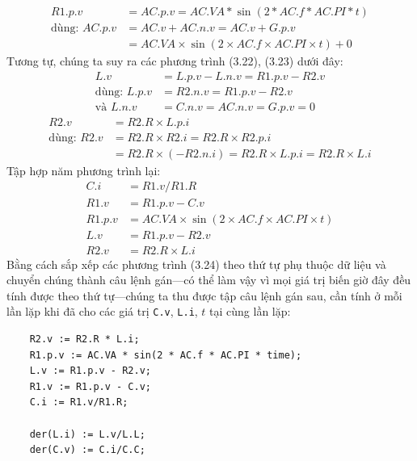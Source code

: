 \begin{equation}
\begin{aligned}
R1.p.v&=AC.p.v=AC.VA*\sin(2*AC.f*AC.PI*t)\\
\text{dùng: }AC.p.v&=AC.v+AC.n.v=AC.v+G.p.v\\
&=AC.VA\times\sin(2\times AC.f\times AC.PI\times t)+0
\end{aligned}\tag{3.21}
\end{equation}
Tương tự, chúng ta suy ra các phương trình (3.22), (3.23) dưới đây:
\begin{equation}
\begin{aligned}
L.v&=L.p.v-L.n.v=R1.p.v-R2.v\\
\text{dùng: }L.p.v&=R2.n.v=R1.p.v-R2.v\\
\text{và }L.n.v&=C.n.v=AC.n.v=G.p.v=0
\end{aligned}\tag{3.22}
\end{equation}
\begin{equation}
\begin{aligned}
R2.v&=R2.R\times L.p.i\\
\text{dùng: }R2.v&=R2.R\times R2.i=R2.R\times R2.p.i\\
&=R2.R\times(-R2.n.i)=R2.R\times L.p.i=R2.R\times L.i
\end{aligned}\tag{3.23}
\end{equation}
Tập hợp năm phương trình lại:
\begin{equation}
\begin{aligned}
C.i&=R1.v/R1.R\\
R1.v&=R1.p.v-C.v\\
R1.p.v&=AC.VA\times\sin(2\times AC.f\times AC.PI\times t)\\
L.v&=R1.p.v-R2.v\\
R2.v&=R2.R\times L.i
\end{aligned}\tag{3.24}
\end{equation}
Bằng cách sắp xếp các phương trình (3.24) theo thứ tự phụ thuộc dữ liệu và chuyển chúng thành câu lệnh gán---có thể làm vậy vì mọi giá trị biến giờ đây đều tính được theo thứ tự---chúng ta thu được tập câu lệnh gán sau, cần tính ở mỗi lần lặp khi đã cho các giá trị \texttt{C.v}, \texttt{L.i}, $t$ tại cùng lần lặp:
\begin{verbatim}
    R2.v := R2.R * L.i;
    R1.p.v := AC.VA * sin(2 * AC.f * AC.PI * time);
    L.v := R1.p.v - R2.v;
    R1.v := R1.p.v - C.v;
    C.i := R1.v/R1.R;

    der(L.i) := L.v/L.L;
    der(C.v) := C.i/C.C;
\end{verbatim}
